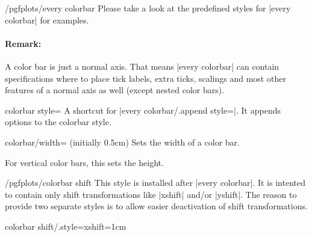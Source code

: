 \begin{stylekey}{/pgfplots/every colorbar}
	Please take a look at the predefined styles for |every colorbar| for examples.

	\paragraph{Remark:} A color bar is just a normal axis. That means |every colorbar| can contain specifications where to place tick labels, extra ticks, scalings and most other features of a normal axis as well (except nested color bars).
\end{stylekey}

\begin{pgfplotskey}{colorbar style=}
	A shortcut for |every colorbar/.append style=|. It appends options to the colorbar style.
\end{pgfplotskey}

\begin{pgfplotskey}{colorbar/width= (initially 0.5cm)}
	Sets the width of a color bar.
\pgfplotsexpensiveexample
\begin{codeexample}[]
\end{codeexample}

	For vertical color bars, this sets the height.
\end{pgfplotskey}


\begin{stylekey}{/pgfplots/colorbar shift}
	This style is installed after |every colorbar|. It is intented to contain only shift transformations like |xshift| and/or |yshift|. The reason to provide two separate styles is to allow easier deactivation of shift transformations.

\begin{codeexample}
colorbar shift/.style={xshift=1cm}
\end{codeexample}
\end{stylekey}


